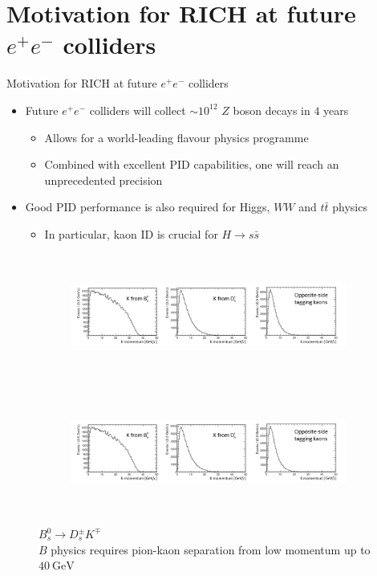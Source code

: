 \documentclass{beamer}
\begin{document}
\section{Motivation for RICH at future \texorpdfstring{$e^+e^-$}{ee} colliders}
\begin{frame}{Motivation for RICH at future $e^+e^-$ colliders}
  \begin{itemize}
    \setlength\itemsep{0.7em}
    \item{Future $e^+e^-$ colliders will collect ${\sim}10^{12}$ $Z$ boson decays in $4$ years}
    \begin{itemize}
      \item{Allows for a world-leading flavour physics programme}
      \item{Combined with excellent PID capabilities, one will reach an unprecedented precision}
    \end{itemize}
    \item{Good PID performance is also required for Higgs, $WW$ and $t\bar{t}$ physics}
    \begin{itemize}
      \item{In particular, kaon ID is crucial for $H\to s\bar{s}$}
    \end{itemize}
  \end{itemize}
  \begin{figure}
    \centering
    \vspace{-0.2cm}
    \begin{subfigure}{0.5\textwidth}
      \includegraphics[height = 4cm, trim = {0 0 22.5cm 0}, clip = true]{Plots/p_spectrum_crop.png}
    \end{subfigure}%
    \begin{subfigure}{0.5\textwidth}
      \includegraphics[height = 4cm, trim = {22.0cm 0 0 0}, clip = true]{Plots/p_spectrum_crop.png}
    \end{subfigure}
    \caption{$B_s^0\to D_s^\pm K^\mp$\\$B$ physics requires pion-kaon separation from low momentum up to $\SI{40}{\giga\eV}$}
  \end{figure}
\end{frame}
\end{document}
